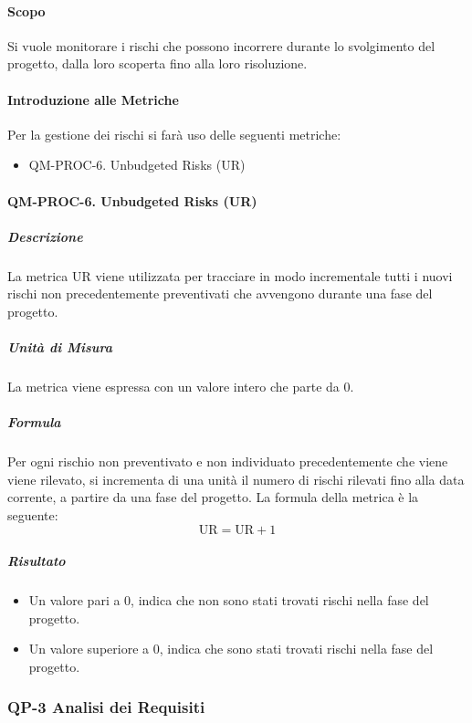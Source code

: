 		\paragraph{Scopo}
		
		Si vuole monitorare i rischi che possono incorrere durante lo svolgimento del progetto, dalla loro scoperta fino alla loro risoluzione.

		\paragraph{Introduzione alle Metriche}

		Per la gestione dei rischi si farà uso delle seguenti metriche:

		\begin{itemize}
			\item QM-PROC-6. Unbudgeted Risks (UR)
		\end{itemize}

		\paragraph{QM-PROC-6. Unbudgeted Risks (UR)}

			\subparagraph{Descrizione}
			La metrica UR viene utilizzata per tracciare in modo incrementale tutti i nuovi rischi non precedentemente preventivati che avvengono durante una fase del progetto.

			\subparagraph{Unità di Misura}
			La metrica viene espressa con un valore intero che parte da 0.

			\subparagraph{Formula}
			Per ogni rischio non preventivato e non individuato precedentemente che viene viene rilevato, si incrementa di una unità il numero di rischi rilevati fino alla data corrente, a partire da una fase del progetto.
			La formula della metrica è la seguente:
			\[
				\text{UR} = \text{UR} + 1
			\]

			\subparagraph{Risultato}
			\begin{itemize}
				\item Un valore pari a 0, indica che non sono stati trovati rischi nella fase del progetto.
				\item Un valore superiore a 0, indica che sono stati trovati rischi nella fase del progetto.
			\end{itemize}

	\subsubsection{QP-3 Analisi dei Requisiti}

